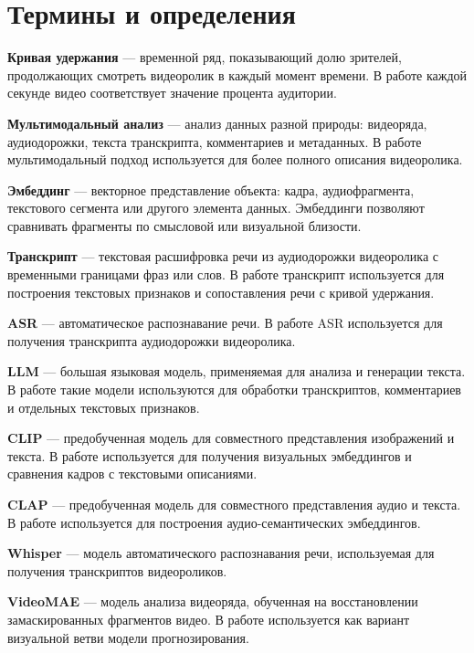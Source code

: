 \documentclass[times]{itmo-student-thesis}
\begin{document}
\pagestyle{fancy}
\renewcommand{\headrulewidth}{0pt}
\renewcommand{\footrulewidth}{0pt}
\setlength{\headheight}{17pt}
\lhead{}\chead{}\rhead{}
\lfoot{}\cfoot{\thepage}\rfoot{}

\tableofcontents

\chapter*{Термины и определения}

\textbf{Кривая удержания} — временной ряд, показывающий долю зрителей, продолжающих смотреть видеоролик в каждый момент времени. В работе каждой секунде видео соответствует значение процента аудитории.

\textbf{Мультимодальный анализ} — анализ данных разной природы: видеоряда, аудиодорожки, текста транскрипта, комментариев и метаданных. В работе мультимодальный подход используется для более полного описания видеоролика.

\textbf{Эмбеддинг} — векторное представление объекта: кадра, аудиофрагмента, текстового сегмента или другого элемента данных. Эмбеддинги позволяют сравнивать фрагменты по смысловой или визуальной близости.

\textbf{Транскрипт} — текстовая расшифровка речи из аудиодорожки видеоролика с временными границами фраз или слов. В работе транскрипт используется для построения текстовых признаков и сопоставления речи с кривой удержания.

\textbf{ASR} — автоматическое распознавание речи. В работе ASR используется для получения транскрипта аудиодорожки видеоролика.

\textbf{LLM} — большая языковая модель, применяемая для анализа и генерации текста. В работе такие модели используются для обработки транскриптов, комментариев и отдельных текстовых признаков.

\textbf{CLIP} — предобученная модель для совместного представления изображений и текста. В работе используется для получения визуальных эмбеддингов и сравнения кадров с текстовыми описаниями.

\textbf{CLAP} — предобученная модель для совместного представления аудио и текста. В работе используется для построения аудио-семантических эмбеддингов.

\textbf{Whisper} — модель автоматического распознавания речи, используемая для получения транскриптов видеороликов.

\textbf{VideoMAE} — модель анализа видеоряда, обученная на восстановлении замаскированных фрагментов видео. В работе используется как вариант визуальной ветви модели прогнозирования.
\end{document}
